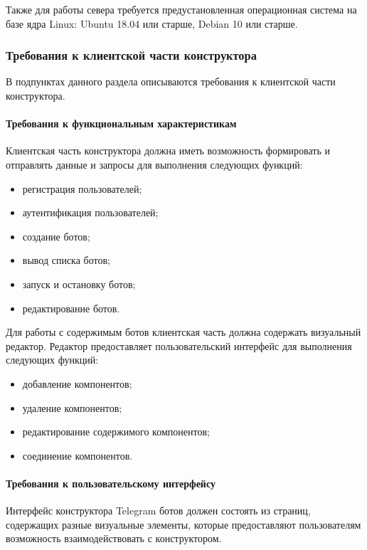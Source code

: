 Также для работы севера требуется предустановленная операционная
система на базе ядра Linux: Ubuntu 18.04 или старше, Debian 10 или старше.

\subsubsection{Требования к клиентской части конструктора}

В подпунктах данного раздела описываются требования к клиентской части конструктора.


\paragraph{Требования к функциональным характеристикам}

Клиентская часть конструктора должна иметь возможность
формировать и отправлять данные и запросы для выполнения следующих
функций:
\begin{itemize}
	\item регистрация пользователей;
	\item аутентификация пользователей;
	\item создание ботов;
	\item вывод списка ботов;
	\item запуск и остановку ботов;
	\item редактирование ботов.
\end{itemize}

Для работы с содержимым ботов клиентская часть должна содержать
визуальный редактор. Редактор предоставляет пользовательский интерфейс
для выполнения следующих функций:
\begin{itemize}
	\item добавление компонентов;
	\item удаление компонентов;
	\item редактирование содержимого компонентов;
	\item соединение компонентов.
\end{itemize}


\paragraph{Требования к пользовательскому интерфейсу}

Интерфейс конструктора Telegram ботов должен состоять из страниц,
содержащих разные визуальные элементы, которые предоставляют
пользователям возможность взаимодействовать с конструктором.

